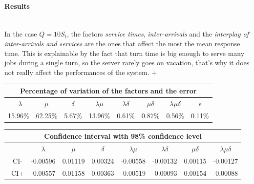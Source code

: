 \documentclass{article}
\begin{document}
                \paragraph{Results} \hfill \\
                    In the case $Q = 10 S_t$, the factors \textit{service times}, \textit{inter-arrivals} and the \textit{interplay of inter-arrivals and services} are the ones that affect the most the mean response time.
                    This is explainable by the fact that turn time is big enough to serve many jobs during a single turn, so the server rarely goes on vacation, that's why it does not really affect the performances of the system.
            +       
                    \begin{table}[htbp]
                        \centering
                        \begin{tabular}{|c|c|c|c|c|c|c|c|}
                            \hline
                            \multicolumn{8}{|c|}{\bf Percentage of variation of the factors and the error} \\
                            \hline
                            \ $\lambda$ & $\mu$ & $\delta$ & $\lambda\mu$ & $\lambda\delta$ & $\mu\delta$ & $\lambda\mu\delta$ & $\epsilon$ \\
                            \hline
                             15.96\% & 62.25\% & 5.67\% & 13.96\% & 0.61\% & 0.87\% & 0.56\% & 0.11\%\\ 
                             \hline   
                        \end{tabular}
                        \label{table:variation_10}
                    \end{table}
                
                    \begin{table}[htbp]
                        \begin{tabular}{|c|c|c|c|c|c|c|c|}
                             \hline
                             \multicolumn{8}{|c|}{\bf Confidence interval with 98\% confidence level} \\
                                
                            \hline
                            \ & $\lambda$ & $\mu$ & $\delta$ & $\lambda\mu$ & $\lambda\delta$ & $\mu\delta$ & $\lambda\mu\delta$\\
                            \hline
                            \ CI- & -0.00596 & 0.01119 & 0.00324 & -0.00558 & -0.00132 & 0.00115 & -0.00127 \\ 
                            \hline
                            \ CI+ & -0.00557 & 0.01158 & 0.00363 & -0.00519 & -0.00093 & 0.00154 & -0.00088 \\ 
                            \hline
                        \end{tabular}
                        \label{table:CI_10}
                    \end{table}
                    
\end{document}
